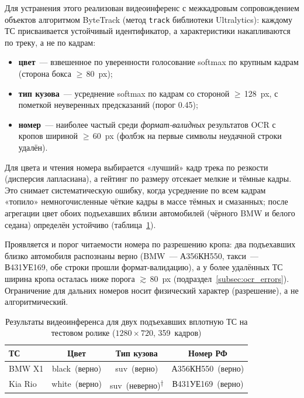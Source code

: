 \documentclass[10pt,a4paper]{report}
\numberwithin{equation}{chapter}
\numberwithin{figure}{chapter}
\numberwithin{table}{chapter}
\begin{document}
Для устранения этого реализован видеоинференс с межкадровым
сопровождением объектов алгоритмом ByteTrack (метод \texttt{track}
библиотеки Ultralytics): каждому ТС присваивается устойчивый
идентификатор, а характеристики накапливаются по треку, а не по кадрам:
\begin{itemize}[nosep]
  \item \textbf{цвет}~--- взвешенное по уверенности голосование softmax
    по крупным кадрам (сторона бокса $\geq$\,80~px);
  \item \textbf{тип кузова}~--- усреднение softmax по кадрам со стороной
    $\geq$\,128~px, с пометкой неуверенных предсказаний (порог 0.45);
  \item \textbf{номер}~--- наиболее частый среди \emph{формат-валидных}
    результатов OCR с кропов шириной $\geq$\,60~px (фолбэк на первые
    символы неудачной строки удалён).
\end{itemize}

Для цвета и чтения номера выбирается «лучший» кадр трека по резкости
(дисперсия лапласиана), а гейтинг по размеру отсекает мелкие и тёмные
кадры. Это снимает систематическую ошибку, когда усреднение по всем
кадрам «топило» немногочисленные чёткие кадры в массе тёмных и смазанных;
после агрегации цвет обоих подъехавших вблизи автомобилей (чёрного BMW и
белого седана) определён устойчиво (таблица~\ref{tab:video_tracks}).

Проявляется и порог читаемости номера по разрешению кропа: два
подъехавших близко автомобиля распознаны верно (BMW~--- А356КН550,
такси~--- В431УЕ169, обе строки прошли формат-валидацию), а у более
удалённых ТС ширина кропа осталась ниже порога $\gtrsim$\,80~px
(подраздел~\ref{subsec:ocr_errors}). Ограничение для дальних номеров
носит физический характер (разрешение), а не алгоритмический.

\begin{table}[H]
\centering
\caption{Результаты видеоинференса для двух подъехавших вплотную ТС
на тестовом ролике ($1280\times720$, 359~кадров)}
\label{tab:video_tracks}
\begin{tabular}{lccc}
\toprule
\textbf{ТС} & \textbf{Цвет} & \textbf{Тип кузова} & \textbf{Номер РФ} \\
\midrule
BMW X1    & black~(верно) & suv~(верно) & А356КН550~(верно) \\
Kia Rio         & white~(верно) & suv~(неверно)\textsuperscript{$\dagger$} & В431УЕ169~(верно) \\
\bottomrule
\end{tabular}
\end{table}
\end{document}
